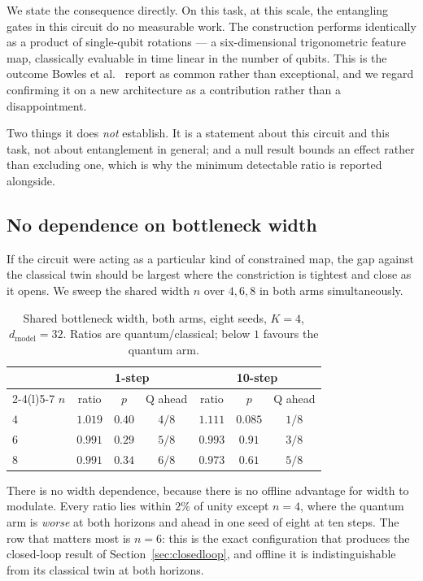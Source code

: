 \documentclass[11pt,onecolumn]{article}
\begin{document}
We state the consequence directly. On this task, at this scale, the
entangling gates in this circuit do no measurable work. The construction
performs identically as a product of single-qubit rotations --- a
six-dimensional trigonometric feature map, classically evaluable in time
linear in the number of qubits. This is the outcome Bowles et
al.~\cite{bowles2024} report as common rather than exceptional, and we
regard confirming it on a new architecture as a contribution rather than
a disappointment.

Two things it does \emph{not} establish. It is a statement about this
circuit and this task, not about entanglement in general; and a null
result bounds an effect rather than excluding one, which is why the
minimum detectable ratio is reported alongside.

\subsection{No dependence on bottleneck width}
If the circuit were acting as a particular kind of constrained map, the
gap against the classical twin should be largest where the constriction
is tightest and close as it opens. We sweep the shared width $n$ over
$4, 6, 8$ in both arms simultaneously.

\begin{table}[htb]\centering\small
\caption{Shared bottleneck width, both arms, eight seeds, $K = 4$,
$d_{\mathrm{model}} = 32$. Ratios are quantum/classical; below $1$
favours the quantum arm.}
\label{tab:width}
\begin{tabular}{lcccccc}
\toprule
& \multicolumn{3}{c}{1-step} & \multicolumn{3}{c}{10-step} \\
\cmidrule(lr){2-4}\cmidrule(l){5-7}
$n$ & ratio & $p$ & Q ahead & ratio & $p$ & Q ahead \\
\midrule
$4$ & $1.019$ & $0.40$ & $4/8$ & $1.111$ & $0.085$ & $1/8$ \\
$6$ & $0.991$ & $0.29$ & $5/8$ & $0.993$ & $0.91$  & $3/8$ \\
$8$ & $0.991$ & $0.34$ & $6/8$ & $0.973$ & $0.61$  & $5/8$ \\
\bottomrule
\end{tabular}
\end{table}

There is no width dependence, because there is no offline advantage for
width to modulate. Every ratio lies within $2\%$ of unity except
$n = 4$, where the quantum arm is \emph{worse} at both horizons and
ahead in one seed of eight at ten steps. The row that matters most is
$n = 6$: this is the exact configuration that produces the closed-loop
result of Section~\ref{sec:closedloop}, and offline it is
indistinguishable from its classical twin at both horizons.
\end{document}
